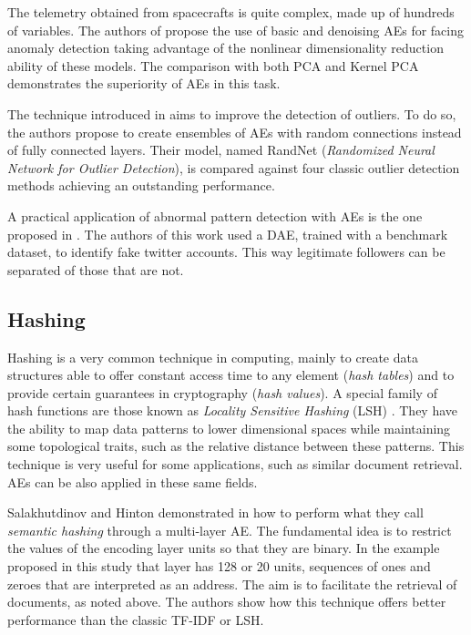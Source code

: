 The telemetry obtained from spacecrafts is quite complex, made up of hundreds of variables. The authors of  propose the use of basic and denoising AEs for facing anomaly detection taking advantage of the nonlinear dimensionality reduction ability of these models. The comparison with both PCA and Kernel PCA demonstrates the superiority of AEs in this task.

The technique introduced in  aims to improve the detection of outliers. To do so, the authors propose to create ensembles of AEs with random connections instead of fully connected layers. Their model, named RandNet (\textit{Randomized Neural Network for Outlier Detection}), is compared against four classic outlier detection methods achieving an outstanding performance.

A practical application of abnormal pattern detection with AEs is the one proposed in . The authors of this work used a DAE, trained with a benchmark dataset, to identify fake twitter accounts. This way legitimate followers can be separated of those that are not.

\subsection{Hashing}\label{p1Sect.Hashing}
Hashing  is a very common technique in computing, mainly to create data structures able to offer constant access time to any element (\textit{hash tables}) and to provide certain guarantees in cryptography (\textit{hash values}). A special family of hash functions are those known as \textit{Locality Sensitive Hashing} (LSH) . They have the ability to map data patterns to lower dimensional spaces while maintaining some topological traits, such as the relative distance between these patterns. This technique is very useful for some applications, such as similar document retrieval. AEs can be also applied in these same fields.

Salakhutdinov and Hinton demonstrated in  how to perform what they call \textit{semantic hashing} through a multi-layer AE. The fundamental idea is to restrict the values of the encoding layer units so that they are binary. In the example proposed in this study that layer has 128 or 20 units, sequences of ones and zeroes that are interpreted as an address. The aim is to facilitate the retrieval of documents, as noted above. The authors show how this technique offers better performance than the classic TF-IDF  or LSH.

